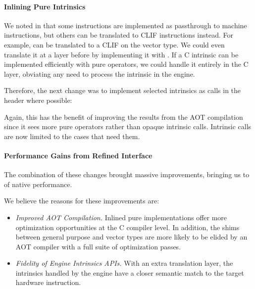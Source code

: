 \newcommand{\changeinline}{Inlining Pure \wasm Intrinsics}
\paragraph{\changeinline}

We noted in  that some instructions are implemented as
passthrough to machine instructions, but others can be translated to CLIF
instructions instead. For example,  can be translated to a CLIF
 on the  vector type.  We could even translate it at a
layer before by implementing it with \wasm {}. If a C intrinsic
can be implemented efficiently with pure \wasm operators, we could handle it
entirely in the C layer, obviating any need to process the intrinsic in the engine.

Therefore, the next change was to implement selected intrinsics as 
calls in the header where possible:
%

Again, this has the benefit of improving the results from the AOT compilation
since it sees more pure \wasm operators rather than opaque intrinsic calls.
Intrinsic calls are now limited to the cases that need them.

\paragraph{Performance Gains from Refined Interface}

The combination of these changes brought massive improvements, bringing us to
\MetricInlineWasmtimeHwwasmDivNative of native performance.

\begin{center}

\end{center}

We believe the reasons for these improvements are:
%
\begin{itemize}
    \item \emph{Improved AOT Compilation.}
        Inlined pure \wasm implementations offer more optimization opportunities
        at the C compiler level.  In addition, the shims between general purpose
        and vector types are more likely to be elided by an AOT compiler with a
        full suite of optimization passes.
    \item \emph{Fidelity of Engine Intrinsics APIs.}
        With an extra translation layer, the intrinsics handled by the engine
        have a closer semantic match to the target hardware instruction.
\end{itemize}
